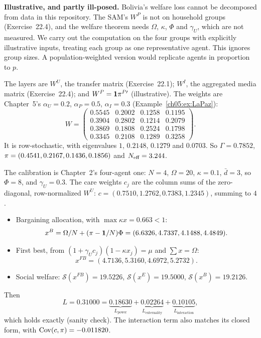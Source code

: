 \documentclass[../solutions_manual.tex]{subfiles}
\begin{document}

\textbf{Illustrative, and partly ill-posed.} Bolivia's welfare loss cannot be decomposed from data in this repository. The SAM's $W^P$ is not on household groups (Exercise~22.4), and the welfare theorem needs $\Omega$, $\kappa$, $\Phi$ and $\gamma_U$, which are not measured. We carry out the computation on the four groups with explicitly illustrative inputs, treating each group as one representative agent. This ignores group sizes. A population-weighted version would replicate agents in proportion to $p$.

 The layers are $W^U$, the transfer matrix (Exercise~22.1); $W^I$, the aggregated media matrix (Exercise~22.4); and $W^P = \mathbf{1}\pi^{P\prime}$ (illustrative). The weights are Chapter~5's $\alpha_U = 0.2$, $\alpha_P = 0.5$, $\alpha_I = 0.3$ (Example~\ref{ch05:ex:LaPaz}):
\[
W = \begin{pmatrix} 0.5545 & 0.2002 & 0.1258 & 0.1195\\ 0.3904 & 0.2802 & 0.1214 & 0.2079\\ 0.3869 & 0.1808 & 0.2524 & 0.1798\\ 0.3345 & 0.2108 & 0.1289 & 0.3258\end{pmatrix}.
\]
It is row-stochastic, with eigenvalues $1$, $0.2148$, $0.1279$ and $0.0703$. So $\Gamma = 0.7852$, $\pi = (0.4541, 0.2167, 0.1436, 0.1856)$ and $N_{\text{eff}} = 3.244$.

 The calibration is Chapter~2's four-agent one: $N = 4$, $\Omega = 20$, $\kappa = 0.1$, $\bar d = 3$, so $\Phi = 8$, and $\gamma_U = 0.3$. The care weights $c_j$ are the column sums of the zero-diagonal, row-normalized $W^U$: $c = (0.7510, 1.2762, 0.7383, 1.2345)$, summing to $4$.
\begin{itemize}
\item Bargaining allocation, with $\max\kappa x = 0.663 < 1$:
\[
x^B = \Omega/N + (\pi - \mathbf{1}/N)\Phi = (6.6326, 4.7337, 4.1488, 4.4849).
\]
\item First best, from $(1+\gamma_Uc_j)(1-\kappa x_j) = \mu$ and $\sum x = \Omega$:
\[
x^{FB} = (4.7136, 5.3160, 4.6972, 5.2732).
\]
\item Social welfare: $\mathcal S(x^{FB}) = 19.5226$, $\mathcal S(x^E) = 19.5000$, $\mathcal S(x^B) = 19.2126$.
\end{itemize}
Then
\[
L = 0.31000 = \underbrace{0.18630}_{L_{\text{power}}} + \underbrace{0.02264}_{L_{\text{externality}}} + \underbrace{0.10105}_{L_{\text{interaction}}},
\]
which holds exactly (sanity check). The interaction term also matches its closed form, with $\operatorname{Cov}(c,\pi) = -0.011820$.
\end{document}
